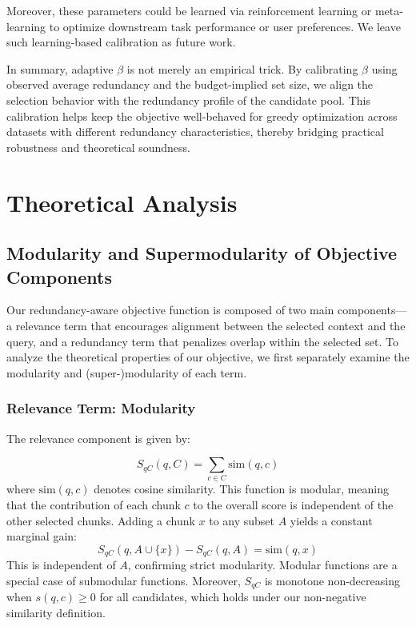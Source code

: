 \documentclass[11pt]{article}
\begin{document}
Moreover, these parameters could be learned via reinforcement learning or meta-learning to optimize downstream task performance or user preferences. We leave such learning-based calibration as future work.

In summary, adaptive $\beta$ is not merely an empirical trick. By calibrating $\beta$ using observed average redundancy and the budget-implied set size, we align the selection behavior with the redundancy profile of the candidate pool. This calibration helps keep the objective well-behaved for greedy optimization across datasets with different redundancy characteristics, thereby bridging practical robustness and theoretical soundness.

\section{Theoretical Analysis}

\subsection{Modularity and Supermodularity of Objective Components}

Our redundancy-aware objective function is composed of two main components—a relevance term that encourages alignment between the selected context and the query, and a redundancy term that penalizes overlap within the selected set. To analyze the theoretical properties of our objective, we first separately examine the modularity and (super-)modularity of each term.

\subsubsection{Relevance Term: Modularity}
The relevance component is given by:

\begin{equation}
  \label{eq:example}
  S_{qC}(q, C) = \sum_{c \in C} \mathrm{sim}(q, c)
\end{equation}
where $\mathrm{sim}(q, c)$ denotes cosine similarity. This function is modular, meaning that the contribution of each chunk $c$ to the overall score is independent of the other selected chunks. Adding a chunk $x$ to any subset $A$ yields a constant marginal gain:
\begin{equation}
  \label{eq:example}
  S_{qC}(q, A \cup \{x\}) - S_{qC}(q, A) = \mathrm{sim}(q, x)
\end{equation}
This is independent of $A$, confirming strict modularity. Modular functions are a special case of submodular functions. Moreover, $S_{qC}$ is monotone non-decreasing when $s(q,c)\ge0$ for all candidates, which holds under our non-negative similarity definition.
\end{document}
